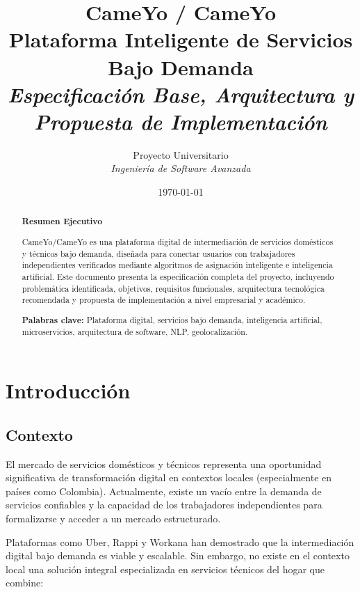 \documentclass[12pt,a4paper,spanish]{article}
\title{
    \textbf{\Huge CameYo / CameYo}\\
    \vspace{0.5cm}
    \textbf{\Large Plataforma Inteligente de Servicios Bajo Demanda}\\
    \vspace{1cm}
    \textit{\large Especificación Base, Arquitectura y Propuesta de Implementación}
}
\author{
    Proyecto Universitario\\
    \textit{Ingeniería de Software Avanzada}
}
\date{\today}
\begin{document}
\maketitle
\vspace{2cm}

\begin{abstract}
    \noindent\textbf{\large Resumen Ejecutivo}
    \vspace{0.5cm}

    CameYo/CameYo es una plataforma digital de intermediación de servicios domésticos y técnicos bajo demanda, diseñada para conectar usuarios con trabajadores independientes verificados mediante algoritmos de asignación inteligente e inteligencia artificial. Este documento presenta la especificación completa del proyecto, incluyendo problemática identificada, objetivos, requisitos funcionales, arquitectura tecnológica recomendada y propuesta de implementación a nivel empresarial y académico.

    \vspace{0.5cm}
    \noindent\textbf{Palabras clave:} Plataforma digital, servicios bajo demanda, inteligencia artificial, microservicios, arquitectura de software, NLP, geolocalización.
\end{abstract}

\newpage
\tableofcontents
\newpage

\section{Introducción}

\subsection{Contexto}

El mercado de servicios domésticos y técnicos representa una oportunidad significativa de transformación digital en contextos locales (especialmente en países como Colombia). Actualmente, existe un vacío entre la demanda de servicios confiables y la capacidad de los trabajadores independientes para formalizarse y acceder a un mercado estructurado.

Plataformas como Uber, Rappi y Workana han demostrado que la intermediación digital bajo demanda es viable y escalable. Sin embargo, no existe en el contexto local una solución integral especializada en servicios técnicos del hogar que combine:
\end{document}
